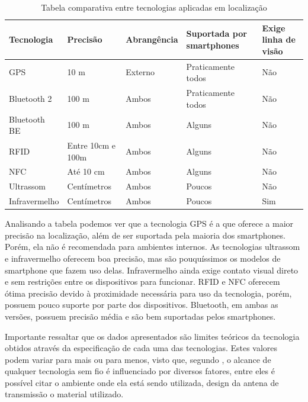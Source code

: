 \documentclass[english,brazilian]{UNISINOSmonografia}
\begin{document}
\begin{table}
	\caption{Tabela comparativa entre tecnologias aplicadas em localização}
	\label{tab:tecnologiasLocalizacao}
		\begin{tabular}{ p{} | p{2cm} | p{} | p{3cm} | p{3cm} }
			\hline
				Tecnologia & Precisão & Abrangência & Suportada por smartphones & Exige linha de visão   \\ \hline
				GPS & 10 m & Externo & Praticamente todos & Não   \\ \hline
				Bluetooth 2 & 100 m & Ambos & Praticamente todos & Não   \\ \hline
				Bluetooth BE & 100 m & Ambos & Alguns & Não   \\ \hline
				RFID & Entre 10cm e 100m & Ambos & Alguns & Não   \\ \hline
				NFC & Até 10 cm & Ambos & Alguns & Não   \\ \hline
				Ultrassom & Centímetros & Ambos & Poucos & Não   \\ \hline
				Infravermelho & Centímetros & Ambos & Poucos & Sim   \\ \hline
			\end{tabular}
\end{table}

Analisando a tabela podemos ver que a tecnologia GPS é a que oferece a maior precisão na localização, além de ser suportada pela maioria dos smartphones. Porém, ela não é recomendada para ambientes internos. As tecnologias ultrassom e infravermelho oferecem boa precisão, mas são pouquíssimos os modelos de smartphone que fazem uso delas. Infravermelho ainda exige contato visual direto e sem restrições entre os dispositivos para funcionar. RFID e NFC oferecem ótima precisão devido à proximidade necessária para uso da tecnologia, porém, possuem pouco suporte por parte dos dispositivos. Bluetooth, em ambas as versões, possuem precisão média e são bem suportadas pelos smartphones.

Importante ressaltar que os dados apresentados são limites teóricos da tecnologia obtidos através da especificação de cada uma das tecnologias. Estes valores podem variar para mais ou para menos, visto que, segundo , o alcance de qualquer tecnologia sem fio é influenciado por diversos fatores, entre eles é possível  citar o ambiente onde ela está sendo utilizada, design da antena de transmissão o material utilizado.

\end{document}
